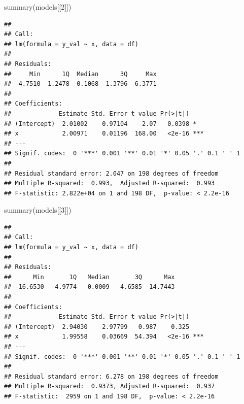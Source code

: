 \documentclass[
]{book}
\newenvironment{Shaded}{\begin{snugshade}}{\end{snugshade}}
\newcommand{\AttributeTok}[1]{\textcolor[rgb]{0.77,0.63,0.00}{#1}}
\newcommand{\ControlFlowTok}[1]{\textcolor[rgb]{0.13,0.29,0.53}{\textbf{#1}}}
\newcommand{\DecValTok}[1]{\textcolor[rgb]{0.00,0.00,0.81}{#1}}
\newcommand{\FunctionTok}[1]{\textcolor[rgb]{0.00,0.00,0.00}{#1}}
\newcommand{\NormalTok}[1]{#1}
\newcommand{\OtherTok}[1]{\textcolor[rgb]{0.56,0.35,0.01}{#1}}
\newcommand{\SpecialCharTok}[1]{\textcolor[rgb]{0.00,0.00,0.00}{#1}}
\begin{document}
\begin{Shaded}
\end{Shaded}

\begin{Shaded}
\begin{Highlighting}[]
\FunctionTok{summary}\NormalTok{(models[[}\DecValTok{2}\NormalTok{]])}
\end{Highlighting}
\end{Shaded}

\begin{verbatim}
## 
## Call:
## lm(formula = y_val ~ x, data = df)
## 
## Residuals:
##     Min      1Q  Median      3Q     Max 
## -4.7510 -1.2478  0.1068  1.3796  6.3771 
## 
## Coefficients:
##             Estimate Std. Error t value Pr(>|t|)    
## (Intercept)  2.01002    0.97104    2.07   0.0398 *  
## x            2.00971    0.01196  168.00   <2e-16 ***
## ---
## Signif. codes:  0 '***' 0.001 '**' 0.01 '*' 0.05 '.' 0.1 ' ' 1
## 
## Residual standard error: 2.047 on 198 degrees of freedom
## Multiple R-squared:  0.993,  Adjusted R-squared:  0.993 
## F-statistic: 2.822e+04 on 1 and 198 DF,  p-value: < 2.2e-16
\end{verbatim}

\begin{Shaded}
\begin{Highlighting}[]
\FunctionTok{summary}\NormalTok{(models[[}\DecValTok{3}\NormalTok{]])}
\end{Highlighting}
\end{Shaded}

\begin{verbatim}
## 
## Call:
## lm(formula = y_val ~ x, data = df)
## 
## Residuals:
##      Min       1Q   Median       3Q      Max 
## -16.6530  -4.9774   0.0009   4.6585  14.7443 
## 
## Coefficients:
##             Estimate Std. Error t value Pr(>|t|)    
## (Intercept)  2.94030    2.97799   0.987    0.325    
## x            1.99558    0.03669  54.394   <2e-16 ***
## ---
## Signif. codes:  0 '***' 0.001 '**' 0.01 '*' 0.05 '.' 0.1 ' ' 1
## 
## Residual standard error: 6.278 on 198 degrees of freedom
## Multiple R-squared:  0.9373, Adjusted R-squared:  0.937 
## F-statistic:  2959 on 1 and 198 DF,  p-value: < 2.2e-16
\end{verbatim}
\end{document}
